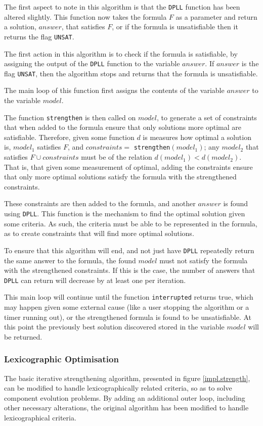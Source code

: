 The first aspect to note in this algorithm is that the \verb+DPLL+ function has been altered slightly.
This function now takes the formula $F$ as a parameter and return a solution, $answer$, that satisfies $F$, 
or if the formula is unsatisfiable then it returns the flag \verb+UNSAT+.

The first action in this algorithm is to check if the formula is satisfiable, by assigning the output of the \verb+DPLL+ function to the variable $answer$.
If $answer$ is the flag \verb+UNSAT+, then the algorithm stops and returns that the formula is unsatisfiable.

The main loop of this function first assigns the contents of the variable $answer$ to the variable $model$.

The function \verb+strengthen+ is then called on $model$, to generate a set of constraints that when added to the formula ensure that only solutions more optimal are satisfiable.
Therefore, given some function $d$ is measures how optimal a solution is, $model_1$ satisfies $F$, and $constraints = $ \verb+strengthen+$(model_1)$;
any $model_2$ that satisfies $F \cup constraints$ must be of the relation $d(model_1) < d(model_2)$.
That is, that given some measurement of optimal, adding the constraints ensure that only more optimal solutions satisfy the formula with the strengthened constraints. 

These constraints are then added to the formula, and another $answer$ is found using \verb+DPLL+.
This function is the mechanism to find the optimal solution given some criteria.
As such, the criteria must be able to be represented in the formula, as to create constraints that will find more optimal solutions.

To ensure that this algorithm will end, and not just have \verb+DPLL+ repeatedly return the same answer to the formula, 
the found $model$ must not satisfy the formula with the strengthened constraints.
If this is the case, the number of answers that \verb+DPLL+ can return will decrease by at least one per iteration.

This main loop will continue until the function \verb+interrupted+ returns true, which may happen given some external cause (like a user stopping the algorithm or a timer running out),
or the strengthened formula is found to be unsatisfiable.
At this point the previously best solution discovered stored in the variable $model$ will be returned.

\subsubsection{Lexicographic Optimisation}
The basic iterative strengthening algorithm, presented in figure \ref{impl.strength}, can be modified to handle lexicographically related criteria, so as to solve component evolution problems.
By adding an additional outer loop, including other necessary alterations, the original algorithm has been modified to handle lexicographical criteria.

